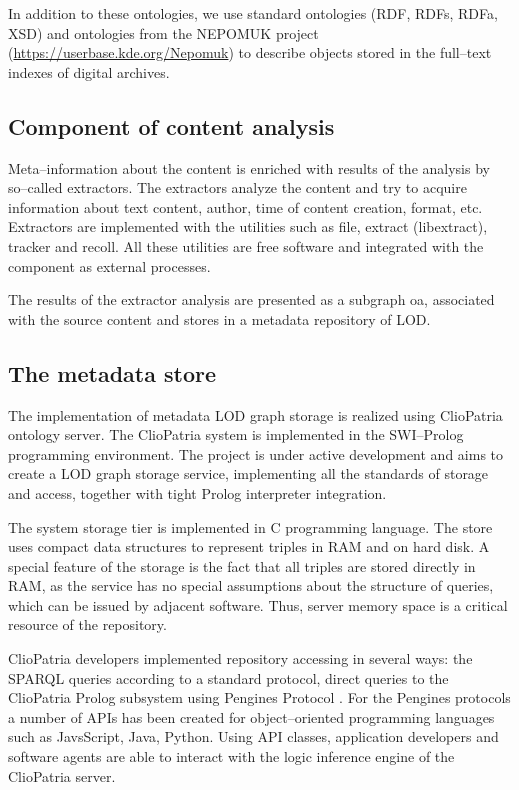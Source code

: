 \documentclass[12pt]{llncs}
\begin{document}
In addition to these ontologies, we use standard ontologies (RDF, RDFs,
RDFa, XSD) and ontologies from the NEPOMUK project
(\url{https://userbase.kde.org/Nepomuk}) to describe objects stored in the
full--text indexes of digital archives.

\subsection{Component of content analysis}

Meta--information about the content is enriched with results of the
analysis by so--called extractors. The extractors analyze the content and
try to acquire information about text content, author, time of content
creation, format, etc. Extractors are implemented with the utilities
such as file, extract (libextract), tracker and recoll. All these
utilities are free software and integrated with the component as
external processes.

The results of the extractor analysis are presented as a subgraph oa,
associated with the source content and stores in a metadata repository
of LOD.

\subsection{The metadata store}

The implementation of metadata LOD graph storage is realized using
ClioPatria \cite{b8} ontology server. The ClioPatria system is implemented
in the SWI--Prolog programming environment. The project is under active
development and aims to create a LOD graph storage service, implementing
all the standards of storage and access, together with tight Prolog
interpreter integration.

The system storage tier is implemented in C programming language. The
store uses compact data structures to represent triples in RAM and on
hard disk. A special feature of the storage is the fact that all triples
are stored directly in RAM, as the service has no special assumptions
about the structure of queries, which can be issued by adjacent
software. Thus, server memory space is a critical resource of the
repository.

ClioPatria developers implemented repository accessing in several ways:
the SPARQL queries according to a standard protocol, direct queries to
the ClioPatria Prolog subsystem using Pengines Protocol \cite{b9}. For the
Pengines protocols a number of APIs has been created for object--oriented
programming languages such as JavsScript, Java, Python. Using API
classes, application developers and software agents are able to interact
with the logic inference engine of the ClioPatria server.
\end{document}
